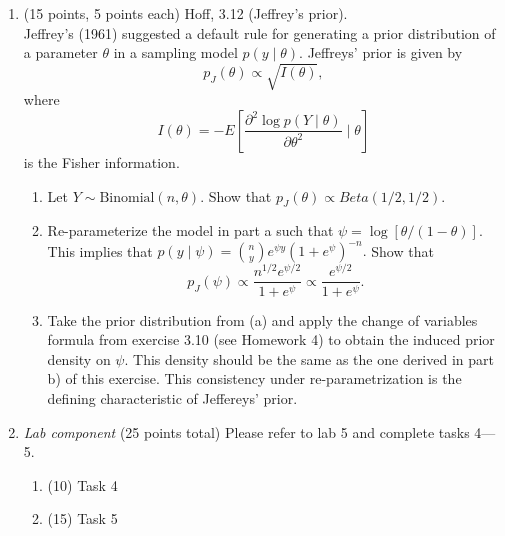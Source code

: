 \documentclass{article}
\begin{document}
\begin{enumerate}
\item (15 points, 5 points each) Hoff, 3.12 (Jeffrey's prior). \\
Jeffrey's (1961) suggested a default rule for generating a prior distribution of a parameter $\theta$ in a sampling model $p(y \mid \theta).$ Jeffreys' prior is given by 
$$p_J(\theta) \propto \sqrt{I(\theta)},$$
where $$I(\theta) = - E\left[
\frac{\partial^2 \log p(Y \mid \theta)}{\partial \theta^2}
\mid \theta \right]
$$ is the Fisher information. 
\begin{enumerate}
\item Let $Y \sim \text{Binomial}(n,\theta).$ Show that $p_J(\theta) \propto Beta(1/2,1/2).$
\item Re-parameterize the model in part a such that $\psi= \log[\theta/(1-\theta)].$ This implies that $p(y \mid \psi) = 
{n \choose y} e^{\psi y} (1 + e^{\psi})^{-n}.$ Show that 
$$p_J(\psi) \propto \frac{n^{1/2}e^{\psi/2}}{1+ e^{\psi}} \propto \frac{e^{\psi/2}}{1+ e^{\psi}}.$$
\item Take the prior distribution from (a) and apply the change of variables formula from exercise 3.10 (see Homework 4) to obtain the induced prior density on $\psi.$ This density should be the same as the one derived in part b) of this exercise. This consistency under re-parametrization is the defining characteristic of Jeffereys' prior. 
\end{enumerate}


\item {\em Lab component} 
  (25 points total) Please refer to lab 5 and complete tasks 4---5. 
  \begin{enumerate}
  \item (10) Task 4
  \item (15) Task 5
  \end{enumerate}
  
\end{enumerate}
\end{document}
